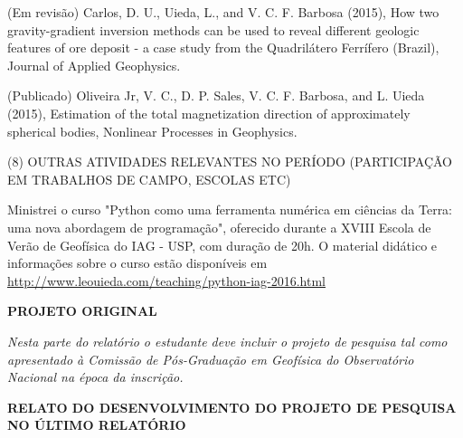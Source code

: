 \documentclass[12pt,a4paper]{article}
\begin{document}
\begin{flushleft}
\bigskip

(Em revisão) Carlos, D. U., Uieda, L., and V. C. F. Barbosa (2015),
How two gravity-gradient inversion methods can be used to reveal different
geologic features of ore deposit - a case study from the Quadrilátero
Ferrífero (Brazil),
Journal of Applied Geophysics.

\bigskip

(Publicado) Oliveira Jr, V. C., D. P. Sales, V. C. F. Barbosa, and L. Uieda
(2015), Estimation of the total magnetization direction of approximately
spherical bodies, Nonlinear Processes in Geophysics.

\bigskip

\noindent (8) OUTRAS ATIVIDADES RELEVANTES NO PERÍODO (PARTICIPAÇÃO EM
TRABALHOS DE CAMPO, ESCOLAS ETC)

\bigskip

Ministrei o curso "Python como uma ferramenta numérica em ciências da Terra:
uma nova abordagem de programação", oferecido durante a XVIII Escola de Verão
de Geofísica do IAG - USP, com duração de 20h.  O material didático e
informações sobre o curso estão disponíveis em
\url{http://www.leouieda.com/teaching/python-iag-2016.html}


\bigskip

\end{flushleft}

\vspace{4cm}

\begin{center}\textbf{\large PROJETO ORIGINAL}\end{center}

\vspace{1cm}

\textit{
Nesta parte do relatório o estudante deve incluir o projeto de pesquisa tal
como apresentado à Comissão de Pós-Graduação em Geofísica do Observatório
Nacional na época da inscrição.
}




\newpage

\begin{center}
\textbf{\large RELATO DO DESENVOLVIMENTO DO PROJETO DE PESQUISA NO ÚLTIMO
RELATÓRIO}
\end{center}
\end{document}
